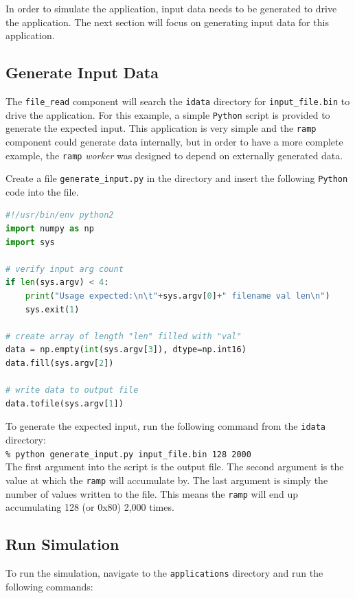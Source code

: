 In order to simulate the application, input data needs to be generated to drive the application. The next section will focus on generating input data for this application.

\subsection{Generate Input Data}
The \verb+file_read+ component will search the \verb+idata+ directory for \verb+input_file.bin+ to drive the application. For this example, a simple \verb+Python+ script is provided to generate the expected input. This application is very simple and the \verb+ramp+ component could generate data internally, but in order to have a more complete example, the \verb+ramp+ \textit{worker} was designed to depend on externally generated data. \newline

Create a file \verb+generate_input.py+ in the  directory and insert the following \verb+Python+ code into the file.
\begin{lstlisting}[language=python]
#!/usr/bin/env python2
import numpy as np
import sys

# verify input arg count
if len(sys.argv) < 4:
    print("Usage expected:\n\t"+sys.argv[0]+" filename val len\n")
    sys.exit(1)

# create array of length "len" filled with "val"
data = np.empty(int(sys.argv[3]), dtype=np.int16)
data.fill(sys.argv[2])

# write data to output file
data.tofile(sys.argv[1])
\end{lstlisting}

To generate the expected input, run the following command from the \verb+idata+ directory:\\

\forceindent\verb+% python generate_input.py input_file.bin 128 2000+\\

The first argument into the script is the output file. The second argument is the value at which the \verb+ramp+ will accumulate by. The last argument is simply the number of values written to the file. This means the \verb+ramp+ will end up accumulating 128 (or 0x80) 2,000 times.

\subsection{Run Simulation}
\bstart
To run the simulation, navigate to the \verb+applications+ directory and run the following commands:\\

